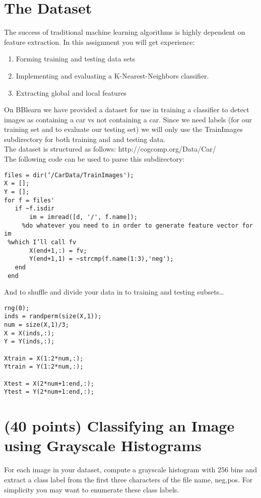 \documentclass[12pt]{article}
\begin{document}
\newpage
\section*{The Dataset}
The success of traditional machine learning algorithms is highly dependent on feature extraction.  In this assignment you will get experience:
\begin{enumerate}
\item Forming training and testing data sets
\item Implementing and evaluating a K-Nearest-Neighbors classifier.
\item Extracting global and local features
\end{enumerate}

\noindent
On BBlearn we have provided a dataset for use in training a classifier to detect images as containing a car vs not containing a car.  Since we need labels (for our training set and to evaluate our testing set) we will only use the TrainImages subdirectory for both training and and testing data.\\
 
\noindent
The dataset is structured as follows: http://cogcomp.org/Data/Car/ \\

\noindent
The following code can be used to parse this subdirectory:

\begin{verbatim}
files = dir(‘/CarData/TrainImages');
X = [];
Y = [];
for f = files'
   if ~f.isdir
       im = imread([d, '/', f.name]);
	 %do whatever you need to in order to generate feature vector for im
 %which I’ll call fv
       X(end+1,:) = fv;
       Y(end+1,1) = ~strcmp(f.name(1:3),'neg');
   end     
 end
\end{verbatim}

\noindent
And to shuffle and divide your data in to training and testing subsets…

\begin{verbatim}
rng(0);
inds = randperm(size(X,1));
num = size(X,1)/3;
X = X(inds,:);
Y = Y(inds,:);
 
Xtrain = X(1:2*num,:);
Ytrain = Y(1:2*num,:);
 
Xtest = X(2*num+1:end,:);
Ytest = Y(2*num+1:end,:);
\end{verbatim}

\newpage
\section{(40 points) Classifying an Image using Grayscale Histograms}
For each image in your dataset, compute a grayscale histogram with 256 bins and extract a class label from the first three characters of the file name, {neg,pos}.  For simplicity you may want to enumerate these class labels.\\
\end{document}
